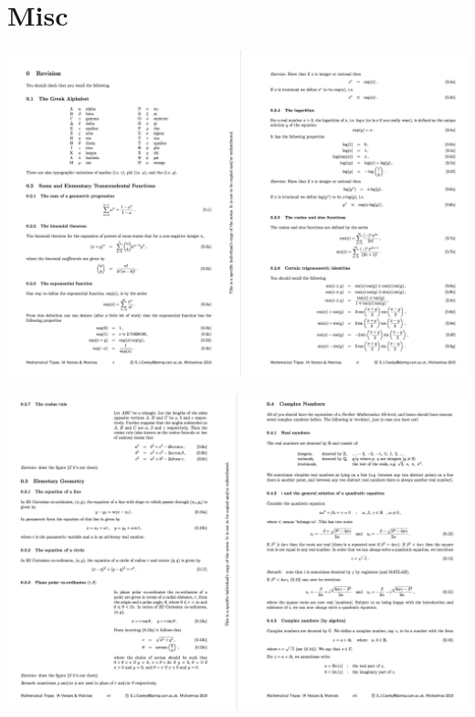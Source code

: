 \section{Misc}
\begin{mdframed}
\includegraphics[width=400pt]{img/misc--cambridge-1a-vectors-and-matrices-revision-1.png}
\end{mdframed}
\begin{mdframed}
\includegraphics[width=400pt]{img/misc--cambridge-1a-vectors-and-matrices-revision-2.png}
\end{mdframed}
